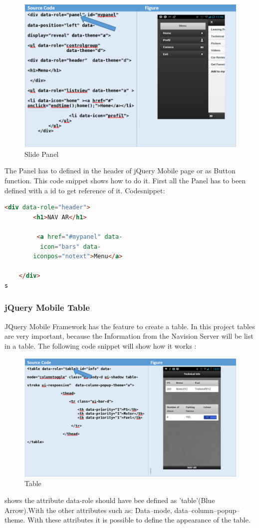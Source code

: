 \begin{figure}[h]
\centering
\includegraphics[width=1.0\linewidth]{graphics/SPanel.PNG}
\caption{Slide Panel}
\end{figure}
\clearpage

The Panel has to defined in the header of jQuery Mobile page or as Button function. This  code snippet  shows how to do it. First all the Panel has to been defined with a id to get reference of it.
Codesnippet:
\begin{lstlisting}[language=html,caption= Panel definition in Header,captionpos=b]
<div data-role="header">
        <h1>NAV AR</h1>

         <a href="#mypanel" data- 
          icon="bars" data- 
        iconpos="notext">Menu</a>

    </div>
s
\end{lstlisting}
\subsubsection{jQuery Mobile Table}
JQuery Mobile Framework has the feature to create a table. In this project tables are very important, because the Information from the Navision Server will be list in a table. The following code snippet will show how it works :
\begin{figure}[H]
\centering
\includegraphics[width=1.0\linewidth]{graphics/Table.PNG}
\caption{Table}
\end{figure}
shows the attribute data-role should have bee defined as 'table'(Blue Arrow).With the other attributes such as:
Data--mode, data--column--popup--theme. With these attributes it is possible to define the appearance of the table.
